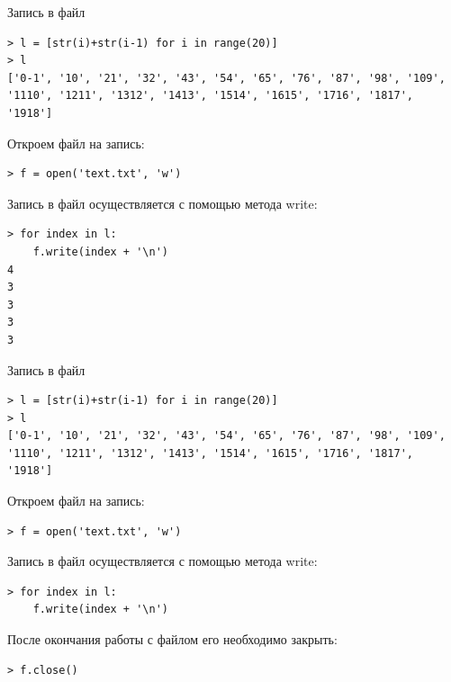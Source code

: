 \documentclass[xcolor=table]{beamer}
\begin{document}
\begin{frame}[fragile]{Запись в файл}
	\begin{verbatim}
> l = [str(i)+str(i-1) for i in range(20)]
> l
['0-1', '10', '21', '32', '43', '54', '65', '76', '87', '98', '109', 
'1110', '1211', '1312', '1413', '1514', '1615', '1716', '1817', '1918']
	\end{verbatim}
	
	Откроем файл на запись:
	\begin{verbatim}
> f = open('text.txt', 'w')
	\end{verbatim}
	
	Запись в файл осуществляется с помощью метода write:
	\begin{verbatim}
> for index in l:
	f.write(index + '\n')
4
3
3
3
3	
	\end{verbatim}
\end{frame}

\begin{frame}[fragile]{Запись в файл}
	\begin{verbatim}
> l = [str(i)+str(i-1) for i in range(20)]
> l
['0-1', '10', '21', '32', '43', '54', '65', '76', '87', '98', '109', 
'1110', '1211', '1312', '1413', '1514', '1615', '1716', '1817', '1918']
	\end{verbatim}
	
	Откроем файл на запись:
	\begin{verbatim}
> f = open('text.txt', 'w')
	\end{verbatim}
	
	Запись в файл осуществляется с помощью метода write:
	\begin{verbatim}
> for index in l:
	f.write(index + '\n')
	\end{verbatim}
	
	После окончания работы с файлом его необходимо закрыть:	
	\begin{verbatim}
> f.close()
	\end{verbatim}
\end{frame}
\end{document}
